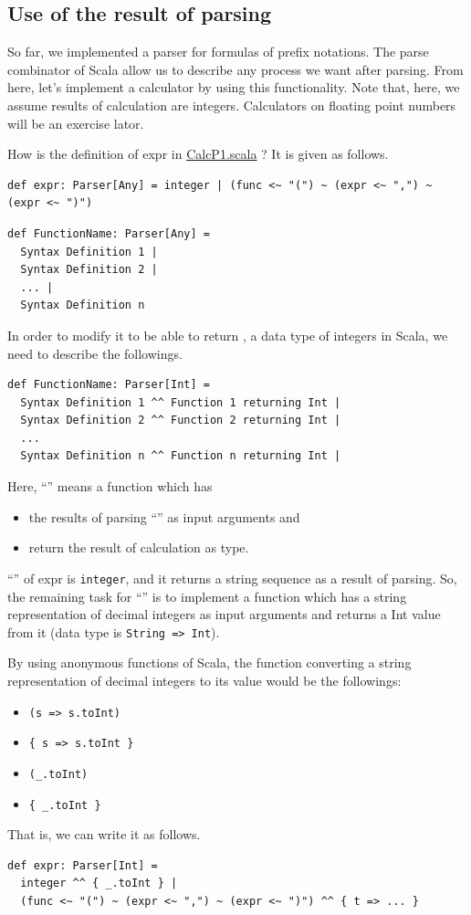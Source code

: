 \documentclass[11pt]{article}
\begin{document}
\subsection{Use of the result of parsing}
\label{sec:orgheadline7}
So far, we implemented a parser for formulas of prefix notations. 
The parse combinator of Scala allow us to describe any process we want 
after parsing. 
From here, let's implement a calculator by using this functionality. 
Note that, here, we assume results of calculation are integers. 
Calculators on floating point numbers will be an exercise lator.

How is the definition of expr in \href{prog/parser/CalcP1.scala}{CalcP1.scala} ?
It is given as follows. 
\begin{verbatim}
def expr: Parser[Any] = integer | (func <~ "(") ~ (expr <~ ",") ~ (expr <~ ")")
\end{verbatim}
\begin{verbatim}
def FunctionName: Parser[Any] = 
  Syntax Definition 1 | 
  Syntax Definition 2 | 
  ... | 
  Syntax Definition n
\end{verbatim}

In order to modify it to be able to return , a data
type of integers in Scala, we need to describe the followings. 
\begin{verbatim}
def FunctionName: Parser[Int] =
  Syntax Definition 1 ^^ Function 1 returning Int |
  Syntax Definition 2 ^^ Function 2 returning Int |
  ...
  Syntax Definition n ^^ Function n returning Int |
\end{verbatim}

Here, ``'' 
means a function which has 
\begin{itemize}
\item the results of parsing ``'' as input arguments and
\item return the result of calculation as  type.
\end{itemize}

``'' of expr is \texttt{integer}, and it returns
a string sequence as a result of parsing. 
So, the remaining task for ``'' 
is to implement a function which has a string 
representation of decimal integers as input arguments and returns a
Int value from it (data type is \texttt{String => Int}). 

By using anonymous functions of Scala, 
the function converting a string representation of decimal integers to
its value would be the followings:
\begin{itemize}
\item \texttt{(s => s.toInt)}
\item \texttt{\{ s => s.toInt \}}
\item \texttt{(\_.toInt)}
\item \texttt{\{ \_.toInt \}}
\end{itemize}
That is, we can write it as follows. 
\begin{verbatim}
def expr: Parser[Int] =
  integer ^^ { _.toInt } |
  (func <~ "(") ~ (expr <~ ",") ~ (expr <~ ")") ^^ { t => ... }
\end{verbatim}
\end{document}
